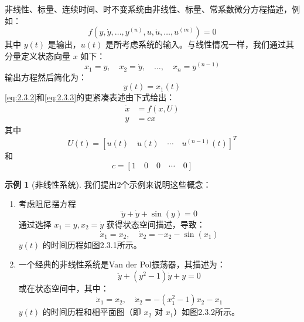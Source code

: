 \documentclass[UTF8,12pt,a4paper]{ctexart}
\theoremstyle{definition}
\newtheorem{example}{示例}[section]
\begin{document}
非线性、标量、连续时间、时不变系统由非线性、标量、常系数微分方程描述，例如：
\begin{equation}\label{eq:2.3.1}
f(y, \dot{y}, \ldots, y^{(n)}, u, \dot{u}, \ldots, u^{(m)}) = 0
\end{equation}
其中 $y(t)$ 是输出，$u(t)$ 是所考虑系统的输入。与线性情况一样，我们通过其分量定义状态向量 $x$ 如下：
\begin{equation}\label{eq:2.3.2}
x_1 = y, \quad x_2 = \dot{y}, \quad \ldots, \quad x_n = y^{(n-1)}
\end{equation}
输出方程然后简化为：
\begin{equation}\label{eq:2.3.3}
y(t) = x_1(t)
\end{equation}
\eqref{eq:2.3.2}和\eqref{eq:2.3.3}的更紧凑表述由下式给出：
\begin{equation}\label{eq:2.3.4}
\begin{aligned}
\dot{x} &= f(x, U) \\
y &= cx
\end{aligned}
\end{equation}
其中
\[
U(t) = [u(t) \quad \dot{u}(t) \quad \cdots \quad u^{(n-1)}(t)]^T
\]
和
\begin{equation}\label{eq:2.3.5}
c = [1 \quad 0 \quad 0 \quad \cdots \quad 0]
\end{equation}

\begin{example}[非线性系统]
我们提出2个示例来说明这些概念：
\begin{enumerate}
\item 考虑阻尼摆方程
\[
\ddot{y} + \dot{y} + \sin(y) = 0
\]
通过选择 $x_1=y, x_2=\dot{y}$ 获得状态空间描述，导致：
\[
\dot{x}_1 = x_2, \quad \dot{x}_2 = -x_2 - \sin(x_1)
\]
$y(t)$ 的时间历程如图2.3.1所示。

\item 一个经典的非线性系统是Van der Pol振荡器，其描述为：
\[
\ddot{y} + (y^2-1)\dot{y} + y = 0
\]
或在状态空间中，其中：
\[
\dot{x}_1 = x_2, \quad \dot{x}_2 = -(x_1^2-1)x_2 - x_1
\]
$y(t)$ 的时间历程和相平面图（即 $x_2$ 对 $x_1$）如图2.3.2所示。
\end{enumerate}
\end{example}
\end{document}
